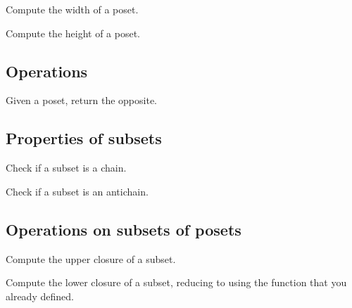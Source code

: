 \begin{exercise}
  Compute the width of a poset.
\end{exercise}

\begin{exercise}
  Compute the height of a poset.
\end{exercise}

\subsection{Operations}


\begin{exercise}
  Given a poset, return the opposite.
\end{exercise}

\subsection{Properties of subsets}


\begin{exercise}
  Check if a subset is a chain.
\end{exercise}

\begin{exercise}
  Check if a subset is an antichain.
\end{exercise}

\subsection{Operations on subsets of posets}

\begin{exercise}
  Compute the upper closure of a subset.

\end{exercise}


\begin{exercise}
  Compute the lower closure of a subset, reducing to
  using the function  that you
  already defined.

\end{exercise}




